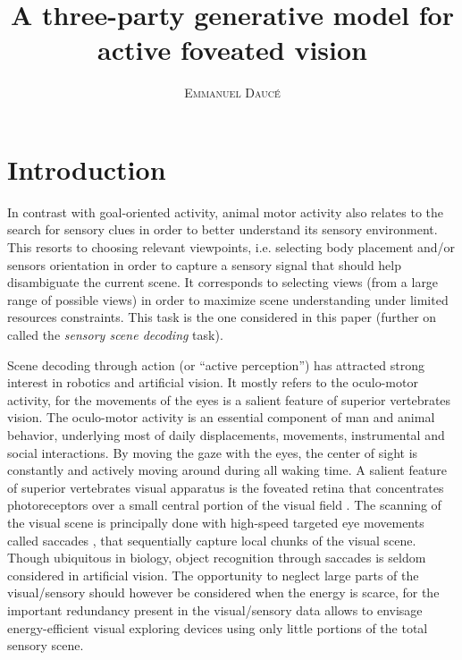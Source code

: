 \documentclass[12pt,twoside,openright]{article}
\title{\textbf{A three-party generative model for active foveated vision} }
\author{\textsc{Emmanuel Daucé}}%
\date{}
\begin{document}
	
\maketitle


	
\section{Introduction}

In contrast with goal-oriented activity, animal motor activity also relates to the search for sensory clues in order to better understand its sensory environment. This resorts to choosing relevant viewpoints, i.e. selecting body placement and/or sensors orientation in order to capture a sensory signal that should help disambiguate the current scene. It corresponds to selecting views (from a large range of possible views) in order to maximize scene understanding under limited resources constraints. This task is the one considered in this paper (further on called the \emph{sensory scene decoding} task). 



Scene decoding through action (or ``active perception'') has attracted strong interest in robotics and artificial vision.  
It mostly refers to the oculo-motor activity, for the movements of the eyes is a salient feature of superior vertebrates vision. The oculo-motor activity is an essential component of man and animal behavior, underlying most of daily displacements, movements, instrumental and social interactions. By moving the gaze with the eyes, the center of sight is constantly and actively moving around during all waking time. 
A salient feature of superior vertebrates visual apparatus is the foveated retina that concentrates  photoreceptors over a small central portion of the visual field \cite{osterberg1935topography}. The scanning of the visual scene is principally done with high-speed targeted eye movements called saccades \cite{yarbus1967eye}, that sequentially capture local chunks of the visual scene. 
Though ubiquitous in biology, object recognition through saccades is seldom considered in artificial vision. 
The opportunity to neglect large parts of the {\color{blue} visual/sensory} should however be considered when the energy is scarce, for the important redundancy present in the {\color{blue} visual/sensory} data allows to envisage energy-efficient visual exploring devices  
using only little portions of the total sensory scene.
\end{document}
